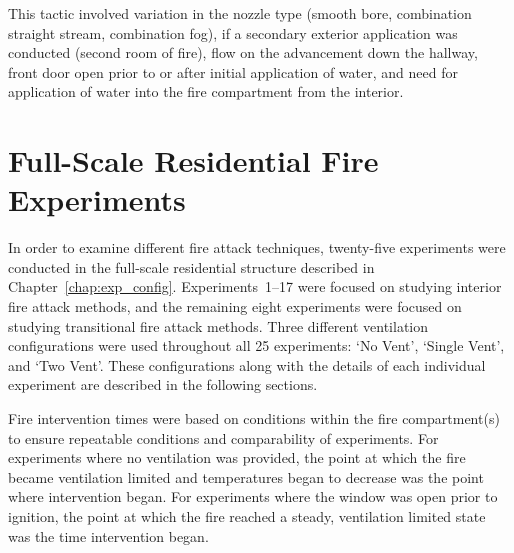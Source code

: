 \documentclass[12pt,oneside]{book}
\begin{document}
This tactic involved variation in the nozzle type (smooth bore, combination straight stream, combination fog), if a secondary exterior application was conducted (second room of fire), flow on the advancement down the hallway, front door open prior to or after initial application of water, and need for application of water into the fire compartment from the interior. 

\chapter{Full-Scale Residential Fire Experiments}

In order to examine different fire attack techniques, twenty-five experiments were conducted in the full-scale residential structure described in Chapter~\ref{chap:exp_config}. Experiments~1--17 were focused on studying interior fire attack methods, and the remaining eight experiments were focused on studying transitional fire attack methods. Three different ventilation configurations were used throughout all 25 experiments: `No Vent', `Single Vent', and `Two Vent'. These configurations along with the details of each individual experiment are described in the following sections.  

Fire intervention times were based on conditions within the fire compartment(s) to ensure repeatable conditions and comparability of experiments. For experiments where no ventilation was provided, the point at which the fire became ventilation limited and temperatures began to decrease was the point where intervention began. For experiments where the window was open prior to ignition, the point at which the fire reached a steady, ventilation limited state was the time intervention began.
\end{document}
